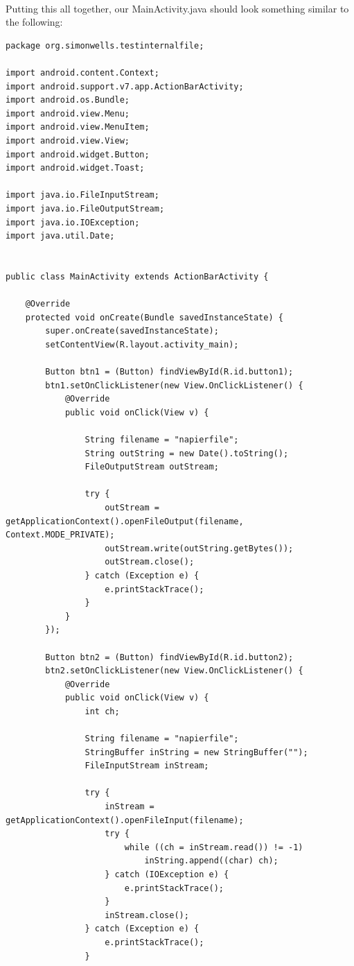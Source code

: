 \documentclass[12pt, a4paper, twoside]{book}
\begin{document}
\paragraph{} Putting this all together, our MainActivity.java should look something similar to the following:

\begin{lstlisting}
package org.simonwells.testinternalfile;

import android.content.Context;
import android.support.v7.app.ActionBarActivity;
import android.os.Bundle;
import android.view.Menu;
import android.view.MenuItem;
import android.view.View;
import android.widget.Button;
import android.widget.Toast;

import java.io.FileInputStream;
import java.io.FileOutputStream;
import java.io.IOException;
import java.util.Date;


public class MainActivity extends ActionBarActivity {

    @Override
    protected void onCreate(Bundle savedInstanceState) {
        super.onCreate(savedInstanceState);
        setContentView(R.layout.activity_main);

        Button btn1 = (Button) findViewById(R.id.button1);
        btn1.setOnClickListener(new View.OnClickListener() {
            @Override
            public void onClick(View v) {

                String filename = "napierfile";
                String outString = new Date().toString();
                FileOutputStream outStream;

                try {
                    outStream = getApplicationContext().openFileOutput(filename, Context.MODE_PRIVATE);
                    outStream.write(outString.getBytes());
                    outStream.close();
                } catch (Exception e) {
                    e.printStackTrace();
                }
            }
        });

        Button btn2 = (Button) findViewById(R.id.button2);
        btn2.setOnClickListener(new View.OnClickListener() {
            @Override
            public void onClick(View v) {
                int ch;

                String filename = "napierfile";
                StringBuffer inString = new StringBuffer("");
                FileInputStream inStream;

                try {
                    inStream = getApplicationContext().openFileInput(filename);
                    try {
                        while ((ch = inStream.read()) != -1)
                            inString.append((char) ch);
                    } catch (IOException e) {
                        e.printStackTrace();
                    }
                    inStream.close();
                } catch (Exception e) {
                    e.printStackTrace();
                }


\end{lstlisting}
\end{document}
